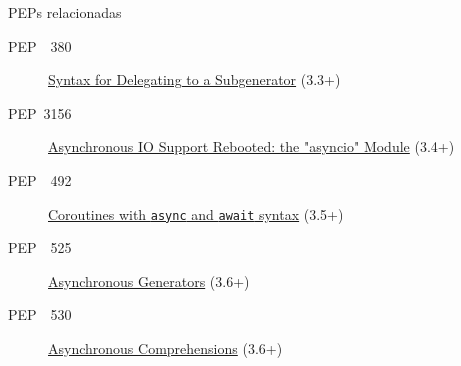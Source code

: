 \documentclass[12pt]{beamer}
\begin{document}
\begin{frame}[fragile]{PEPs relacionadas}
  \begin{description}
    \item[PEP\ \ 380] \href{https://www.python.org/dev/peps/pep-0380/}{Syntax for Delegating to a Subgenerator} (3.3+)\\
    \item[PEP\ 3156] \href{https://www.python.org/dev/peps/pep-3156/}{Asynchronous IO Support Rebooted: the "asyncio" Module} (3.4+)\\
    \item[PEP\ \ 492] \href{https://www.python.org/dev/peps/pep-0492/}{Coroutines with \texttt{async} and \texttt{await} syntax} (3.5+)\\
    \item[PEP\ \ 525] \href{https://www.python.org/dev/peps/pep-0525/}{Asynchronous Generators} (3.6+)\\
    \item[PEP\ \ 530] \href{https://www.python.org/dev/peps/pep-0530/}{Asynchronous Comprehensions} (3.6+)\\
  \end{description}
\end{frame}
\end{document}

